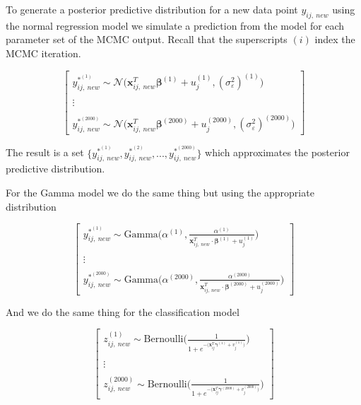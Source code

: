 \documentclass[12pt,twoside]{reedthesis}
\begin{document}
To generate a posterior predictive distribution for a new data point \(y_{ij,\ new}\) using the normal regression model we simulate a prediction from the model for each parameter set of the MCMC output. Recall that the superscripts \((i)\) index the MCMC iteration.

\[
\begin{bmatrix}
y_{ij, \ new}^{*^{(1)}} \sim \mathcal{N}\Big( \mathbf{x}_{ij, \ new}^T \boldsymbol{\beta}^{(1)} + u_j^{(1)}, (\sigma_{\varepsilon}^2)^{(1)}\Big) \\
\\
\vdots \\
\\
y_{ij, \ new}^{*^{(2000)}} \sim \mathcal{N}\Big(\mathbf{x}_{ij, \ new}^T \boldsymbol{\beta}^{(2000)} + u_j^{(2000)}, (\sigma_{\varepsilon}^2)^{(2000)}\Big)
\end{bmatrix}
\]

The result is a set \(\Big\{y_{ij , \ new}^{*^{(1)}}, y_{ij, \ new}^{*^{(2)}}, ..., y_{ij, \ new}^{*^{(2000)}}\Big\}\) which approximates the posterior predictive distribution.

For the Gamma model we do the same thing but using the appropriate distribution

\[
\begin{bmatrix}
y_{ij, \ new}^{*^{(1)}} \sim \text{Gamma}\Bigg(\alpha^{(1)}, \frac{\alpha^{(1)}}{ \mathbf{x}_{ij, \ new}^T\cdot \boldsymbol{\beta}^{(1)} + u_j^{(1)}}\Bigg) \\
\\
\vdots \\
\\
y_{ij, \ new}^{*^{(2000)}} \sim \text{Gamma}\Bigg(\alpha^{(2000)}, \frac{\alpha^{(2000)}}{ \mathbf{x}_{ij, \ new}^T\cdot \boldsymbol{\beta}^{(2000)} + u_j^{(2000)}}\Bigg)
\end{bmatrix}
\]

And we do the same thing for the classification model

\[
\begin{bmatrix}
z_{ij, \ new}^{(1)} \sim \text{Bernoulli}\Bigg(\frac{1}{1 + e^{-\big(\mathbf{x}_{ij}^T\boldsymbol{\gamma}^{(1)} + v_j^{(1)}\big)}}\Bigg) \\
\\ \vdots \\ \\
z_{ij, \ new}^{(2000)} \sim \text{Bernoulli}\Bigg(\frac{1}{1 + e^{-\big(\mathbf{x}_{ij}^T\boldsymbol{\gamma}^{(2000)} + v_j^{(2000)}\big)}}\Bigg)
\end{bmatrix}
\]
\end{document}
